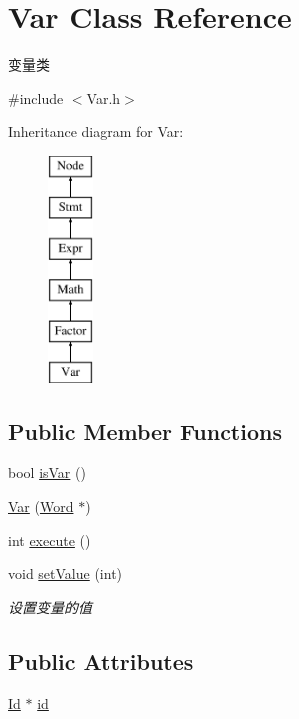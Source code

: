 \hypertarget{class_var}{}\section{Var Class Reference}
\label{class_var}


变量类  




{\ttfamily \#include $<$Var.\+h$>$}

Inheritance diagram for Var\+:\begin{figure}[H]
\begin{center}
\leavevmode
\includegraphics[height=6.000000cm]{class_var}
\end{center}
\end{figure}
\subsection*{Public Member Functions}
\begin{DoxyCompactItemize}
\item 
bool \hyperlink{class_var_a50aa6f54310903a8bc36184813a2b9ef}{is\+Var} ()
\item 
\hyperlink{class_var_ab111df39c1575d7ba1f96f3b89574b8c}{Var} (\hyperlink{class_word}{Word} $\ast$)
\item 
int \hyperlink{class_var_a9dc96e803f7b0f9aa519c2c0e0a6bd8f}{execute} ()
\item 
void \hyperlink{class_var_af0f42d31f5001ff4d4781b9ba199a612}{set\+Value} (int)
\begin{DoxyCompactList}\small\item\em 设置变量的值 \end{DoxyCompactList}\end{DoxyCompactItemize}
\subsection*{Public Attributes}
\begin{DoxyCompactItemize}
\item 
\hyperlink{class_id}{Id} $\ast$ \hyperlink{class_var_a3e5c7c9425da4659290da5c0553c7dc6}{id}
\end{DoxyCompactItemize}
